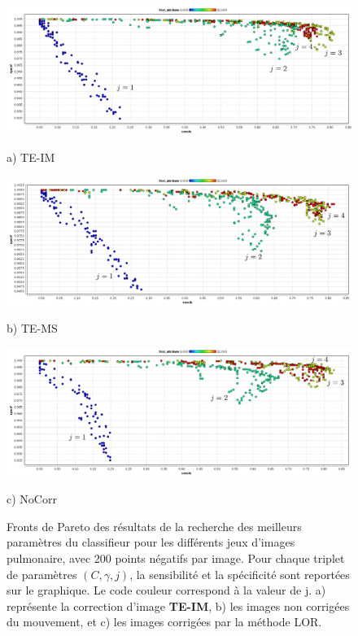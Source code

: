 \begin{figure}[h!]

\begin{center}
 \includegraphics[width=14cm]{images/pareto_mod_IM}

{\small a) TE-IM}
\vspace{0.5cm}

\includegraphics[width=14cm]{images/pareto_mod_LOR}
 
{\small b) TE-MS}
\vspace{0.5cm}

\includegraphics[width=14cm]{images/pareto_mod_NoCorr}

{\small c) NoCorr}

\end{center}
 \caption[Fronts de Pareto des résultats de la recherche des meilleurs paramètres du classifieur pour les différents jeux d'images pulmonaire]{Fronts de Pareto des résultats de la recherche des meilleurs paramètres du classifieur pour les différents jeux d'images pulmonaire, avec 200 points négatifs par image. Pour chaque triplet de paramètres $(C, \gamma, j)$, la sensibilité et la spécificité sont reportées sur le graphique. Le code couleur correspond à la valeur de j. a) représente la correction d'image \textbf{TE-IM}, b) les images non corrigées du mouvement, et c) les images corrigées par la méthode LOR.}
\label{fig:paretoModalite} 
\end{figure}








